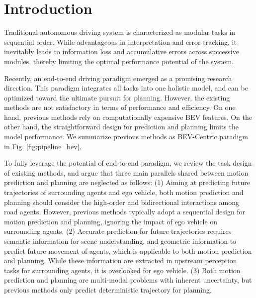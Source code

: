 \section{Introduction} \label{introduction}


Traditional autonomous driving system is characterized as
modular tasks in sequential order. While advantageous in interpretation and error tracking, it inevitably leads to information loss and accumulative errors across successive modules, thereby limiting the optimal performance potential of the system.

Recently, an end-to-end driving paradigm emerged as a promising research direction. This paradigm integrates all tasks into one holistic model, and can be optimized toward the ultimate pursuit for planning. However, the existing methods\cite{uniad, vad} are not satisfactory in terms of performance and efficiency. On one hand, previous methods rely on computationally expensive BEV features. On the other hand, the straightforward design for prediction and planning limits the model performance. We summarize previous 
methods as BEV-Centric paradigm in Fig. \ref{fig:pipeline_bev}.

To fully leverage the potential of end-to-end paradigm, we review the task design of existing methods, and argue that three main parallels shared between motion prediction and planning are neglected as follows: (1) Aiming at predicting future trajectories of surrounding agents and ego vehicle, both motion prediction and planning should consider the high-order and bidirectional interactions among road agents. However, previous methods typically adopt a sequential design for motion prediction and planning, ignoring the impact of ego vehicle on surrounding agents. (2) Accurate prediction for future trajectories requires semantic information for scene understanding, and geometric information to predict future movement of agents, which is applicable to both motion prediction and planning. While these information are extracted in upstream perception tasks for surrounding agents, it is overlooked for ego vehicle. (3) Both motion prediction and planning are multi-modal problems with inherent uncertainty, but previous methods only predict deterministic trajectory for planning. 

